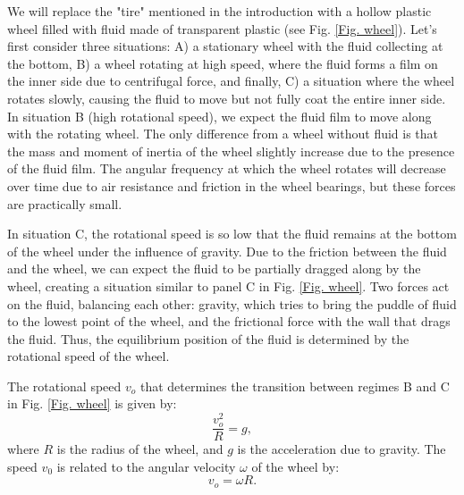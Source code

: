 \documentclass{article}
\begin{document}
We will replace the "tire" mentioned in the introduction with a hollow plastic wheel filled with fluid made of transparent plastic (see Fig. \ref{Fig. wheel}). Let's first consider three situations: A) a stationary wheel with the fluid collecting at the bottom, B) a wheel rotating at high speed, where the fluid forms a film on the inner side due to centrifugal force, and finally, C) a situation where the wheel rotates slowly, causing the fluid to move but not fully coat the entire inner side. In situation B (high rotational speed), we expect the fluid film to move along with the rotating wheel. The only difference from a wheel without fluid is that the mass and moment of inertia of the wheel slightly increase due to the presence of the fluid film. The angular frequency at which the wheel rotates will decrease over time due to air resistance and friction in the wheel bearings, but these forces are practically small.

In situation C, the rotational speed is so low that the fluid remains at the bottom of the wheel under the influence of gravity. Due to the friction between the fluid and the wheel, we can expect the fluid to be partially dragged along by the wheel, creating a situation similar to panel C in Fig. \ref{Fig. wheel}. Two forces act on the fluid, balancing each other: gravity, which tries to bring the puddle of fluid to the lowest point of the wheel, and the frictional force with the wall that drags the fluid. Thus, the equilibrium position of the fluid is determined by the rotational speed of the wheel.

The rotational speed $v_o$ that determines the transition between regimes B and C in Fig. \ref{Fig. wheel} is given by:
\begin{equation}
    \frac{v_o^2}{R} = g, \label{eq:centrifuge}
\end{equation}
where $R$ is the radius of the wheel, and $g$ is the acceleration due to gravity. The speed $v_0$ is related to the angular velocity $\omega$ of the wheel by:
\begin{equation}
    v_o = \omega R. \label{eq:v0=omegaR}
\end{equation}
\end{document}

